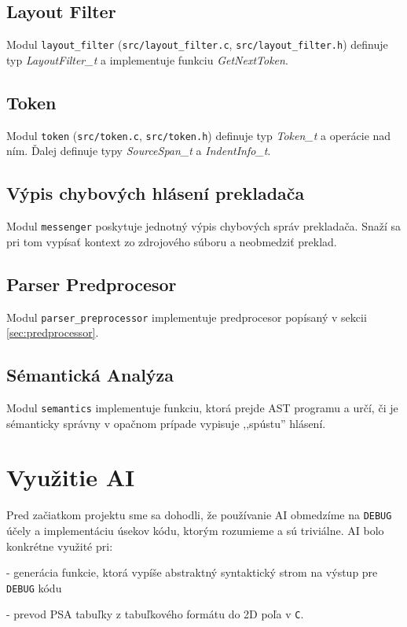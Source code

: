\documentclass[11pt,a4paper]{article}
\begin{document}
  \subsection{Layout Filter}
  Modul \texttt{layout\_filter} (\texttt{src/layout\_filter.c},
  \texttt{src/layout\_filter.h}) definuje typ \textit{LayoutFilter\_t} a
  implementuje funkciu \textit{GetNextToken}.

  \subsection{Token}
  Modul \texttt{token} (\texttt{src/token.c}, \texttt{src/token.h}) definuje
  typ \textit{Token\_t} a operácie nad ním. Ďalej definuje typy
  \textit{SourceSpan\_t} a \textit{IndentInfo\_t}.



  \subsection{Výpis chybových hlásení prekladača}

  Modul \texttt{messenger} poskytuje jednotný výpis chybových správ prekladača.
  Snaží sa pri tom vypísať kontext zo zdrojového súboru a neobmedziť preklad.

  \subsection{Parser Predprocesor}

  Modul \texttt{parser\_preprocessor} implementuje predprocesor popísaný v
  sekcii \ref{sec:predprocessor}.

  \subsection{Sémantická Analýza}

  Modul \texttt{semantics} implementuje funkciu, ktorá prejde AST programu
  a určí, či je sémanticky správny v opačnom prípade vypisuje ,,spústu''
  hlásení.


  \section{Využitie AI}
  Pred začiatkom projektu sme sa dohodli, že používanie AI obmedzíme na 
  \texttt{DEBUG} účely a implementáciu úsekov kódu, ktorým rozumieme a sú 
  triviálne. AI bolo konkrétne využité pri:

   - generácia funkcie, 
  ktorá vypíše abstraktný syntaktický strom na výstup pre \texttt{DEBUG} 
  kódu 

  - prevod PSA tabuľky z tabuľkového formátu do 2D poľa v \texttt{C}.
\end{document}
